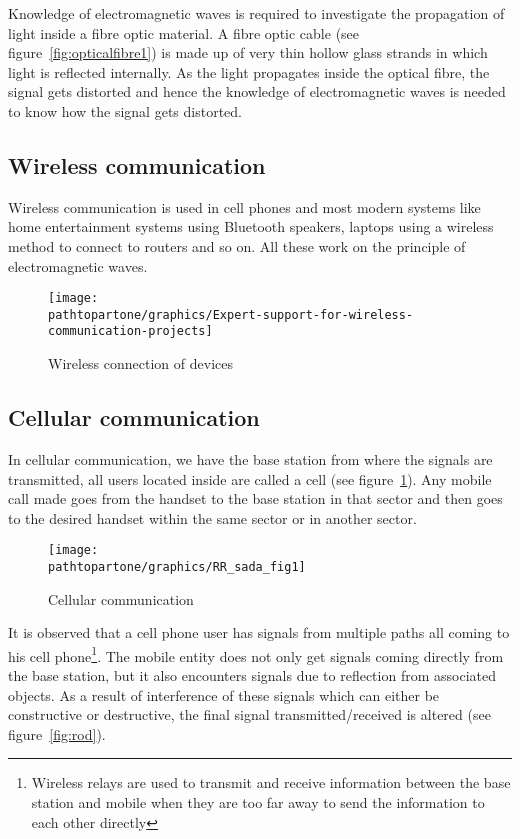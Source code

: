 Knowledge of electromagnetic waves is required to investigate the propagation of light inside a fibre optic material. A fibre optic cable (see figure~\ref{fig:opticalfibre1}) is made up of very thin hollow glass strands in which light is reflected internally. As the light propagates inside the optical fibre, the signal gets distorted and hence the knowledge of electromagnetic waves is needed to know how the signal gets distorted.

\subsection{Wireless communication}
Wireless communication is used in cell phones and most modern systems like home entertainment systems using Bluetooth speakers, laptops using a wireless method to connect to routers and so on. All these work on the principle of electromagnetic waves.
\begin{figure}[h]
\centering
\texttt{[image: \\pathtopartone/graphics/Expert-support-for-wireless-communication-projects]}
\caption{Wireless connection of devices}
\end{figure}

\subsection{Cellular communication} 
In cellular communication, we have the base station from where the signals are transmitted, all users located inside are called a cell (see figure~\ref{fig:rrsadafig1}). Any mobile call made goes from the handset to the base station in that sector and then goes to the desired handset within the same sector or in another sector.
\begin{figure}[h]
\centering
\texttt{[image: \\pathtopartone/graphics/RR\_sada\_fig1]}
\caption{Cellular communication}
\label{fig:rrsadafig1}
\end{figure}

It is observed that a cell phone user has signals from multiple paths all coming to his cell phone\footnote{Wireless relays are used to transmit and receive information between the base station and mobile when they are too far away to send the information to each other directly}. The mobile entity does not only get signals coming directly from the base station, but it also encounters signals due to reflection from associated objects. As a result of interference of these signals which can either be constructive or destructive, the final signal transmitted/received is altered (see figure~\ref{fig:rod}). 

